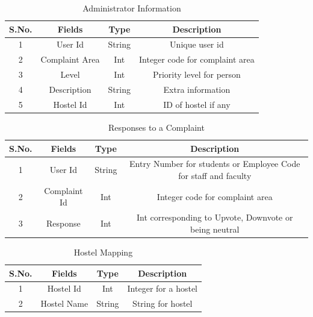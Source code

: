 \documentclass{article}
\begin{document}
\begin{table}[H]
\centering
\caption{Administrator Information}
\label{my-label}
\begin{tabular}{|c|c|c|c|}
\hline
\textbf{S.No.} & \textbf{Fields} & \textbf{Type} & \textbf{Description}                                             \\ \hline
1              & User Id         & String        & Unique user id \\ \hline
2              & Complaint Area  & Int           & Integer code for complaint area                                  \\ \hline
3              & Level           & Int           & Priority level for person                                        \\ \hline
4              & Description     & String        & Extra information                                                \\ \hline
5 				& Hostel Id  & Int & ID of hostel if any \\ \hline
\end{tabular}
\end{table}



\begin{table}[H]
\centering
\caption{Responses to a Complaint}
\label{my-label}
\begin{tabular}{|c|c|c|c|}
\hline
\textbf{S.No.} & \textbf{Fields} & \textbf{Type} & \textbf{Description}                                             \\ \hline
1              & User Id         & String        & Entry Number for students or Employee Code for staff and faculty \\ \hline
2              & Complaint Id    & Int           & Integer code for complaint area                                  \\ \hline
3              & Response         & Int           & Int corresponding to Upvote, Downvote or being neutral           \\ \hline
\end{tabular}
\end{table}


\begin{table}[H]
\centering
\caption{Hostel Mapping}
\label{my-label}
\begin{tabular}{|c|c|c|c|}
\hline
\textbf{S.No.} & \textbf{Fields} & \textbf{Type} & \textbf{Description} \\ \hline
1              & Hostel Id       & Int           & Integer for a hostel \\ \hline
2              & Hostel Name     & String        & String for hostel    \\ \hline
\end{tabular}
\end{table}
\end{document}

